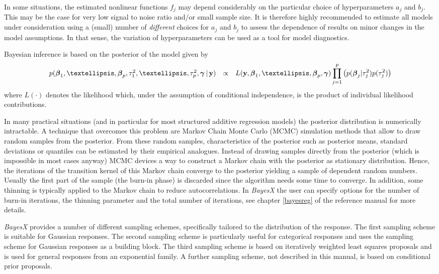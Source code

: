 \documentclass[11pt,a4paper,twoside]{bayesxarticle}
\begin{document}
In some situations, the estimated nonlinear functions $f_j$ may
depend considerably on the particular choice of hyperparameters
$a_j$ and $b_j$. This may be the case for very low signal to noise
ratio and/or small sample size. It is therefore highly recommended
to estimate all models under consideration using a (small) number of
{\em different} choices for $a_j$ and $b_j$ to assess the dependence
of results on minor changes in the model assumptions. In that sense,
the variation of hyperparameters can be used as a tool for model
diagnostics.

Bayesian inference is based on the posterior of the model given by
\begin{equation}
\label{posterior}
\begin{array}{lll}
 p(\betavec_1,\dots,\betavec_p,\tau^2_1,\dots,\tau^2_p,\gammavec \, | \, \yvec) & \propto & L(\yvec,\betavec_1,\dots,\betavec_p, \gammavec )
\displaystyle \prod_{j=1}^p \left( p(\betavec_j|\tau_j^2) p(\tau^2_j)
\right)
 \end{array}
\end{equation}
where  $L(\cdot)$ denotes the likelihood which, under the assumption
of conditional independence, is the product of individual likelihood
contributions.

In many practical situations (and in particular for most structured
additive regression models) the posterior distribution is
numerically intractable. A technique that overcomes this problem are
Markov Chain Monte Carlo (MCMC) simulation methods that allow to
draw random samples from the posterior. From these random samples,
characteristics of the posterior such as posterior means, standard
deviations or quantiles can be estimated by their empirical
analogues. Instead of drawing samples directly from the posterior
(which is impossible in most cases anyway) MCMC devices a way to
construct a Markov chain with the posterior as stationary
distribution. Hence, the iterations of the transition kernel of this
Markov chain converge to the posterior yielding a sample of
dependent random numbers. Usually the first part of the sample (the
burn-in phase) is discarded since the algorithm needs some time to
converge. In addition, some thinning is typically applied to the
Markov chain to reduce autocorrelations. In {\em BayesX} the user
can specify options for the number of burn-in iterations, the
thinning parameter and the total number of iterations, see chapter
\ref*{bayesreg} of the reference manual for more details.

{\em BayesX} provides a number of different sampling schemes,
specifically tailored to the distribution of the response. The first
sampling scheme is suitable for Gaussian responses. The second
sampling scheme is particularly useful for categorical responses and
uses the sampling scheme for Gaussian responses as a building block.
The third sampling scheme is based on iteratively weighted least
squares proposals and is used for general responses from an
exponential family. A further sampling scheme, not described in this
manual, is based on conditional prior proposals.
\end{document}
